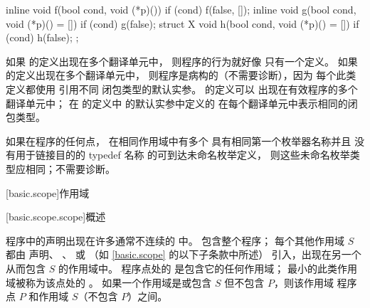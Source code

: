 \pnum
\begin{example}
\begin{codeblock}
inline void f(bool cond, void (*p)()) {
  if (cond) f(false, []{});
}
inline void g(bool cond, void (*p)() = []{}) {
  if (cond) g(false);
}
struct X {
  void h(bool cond, void (*p)() = []{}) {
    if (cond) h(false);
  }
};
\end{codeblock}

如果  的定义出现在多个翻译单元中，
则程序的行为就好像
 只有一个定义。
如果  的定义出现在多个翻译单元中，
则程序是病构的（不需要诊断），因为
每个此类定义都使用
引用不同  闭包类型的默认实参。
 的定义可以
出现在有效程序的多个翻译单元中；
在  的定义中  的默认实参中定义的 
在每个翻译单元中表示相同的闭包类型。
\end{example}

\pnum
如果在程序的任何点，
在相同作用域中有多个
具有相同第一个枚举器名称并且
没有用于链接目的的 typedef 名称 的可到达未命名枚举定义，
则这些未命名枚举类型应相同；不需要诊断。

[basic.scope]{作用域}%

[basic.scope.scope]{概述}

\pnum
程序中的声明出现在许多通常不连续的  中。
 包含整个程序；
每个其他作用域 $S$ 都由
声明、
、
 或 
（如 \ref{basic.scope} 的以下子条款中所述）
引入，出现在另一个从而包含 $S$ 的作用域中。
程序点处的  是包含它的任何作用域；
最小的此类作用域被称为该点处的 。
如果一个作用域是或包含 $S$ 但不包含 $P$，则该作用域 
程序点 $P$ 和作用域 $S$（不包含 $P$）之间。

